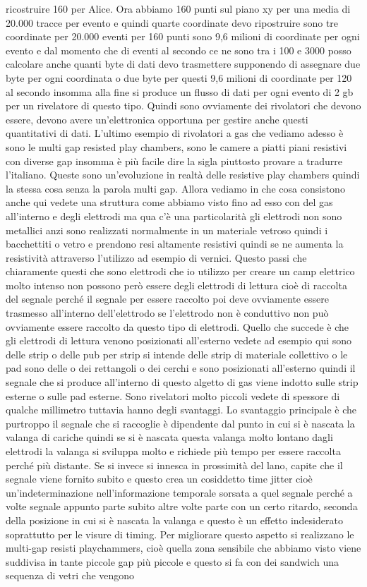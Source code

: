 {ricostruire 160 per Alice. Ora abbiamo 160 punti sul piano xy per una media di 20.000 tracce per evento e quindi quarte coordinate devo ripostruire sono tre coordinate per 20.000 eventi per 160 punti sono 9,6 milioni di coordinate per ogni evento e dal momento che di eventi al secondo ce ne sono tra i 100 e 3000 posso calcolare anche quanti byte di dati devo trasmettere supponendo di assegnare due byte per ogni coordinata o due byte per questi 9,6 milioni di coordinate per 120 al secondo insomma alla fine si produce un flusso di dati per ogni evento di 2 gb per un rivelatore di questo tipo. Quindi sono ovviamente dei rivolatori che devono essere, devono avere un'elettronica opportuna per gestire anche questi quantitativi di dati. L'ultimo esempio di rivolatori a gas che vediamo adesso è sono le multi gap resisted play chambers, sono le camere a piatti piani resistivi con diverse gap insomma è più facile dire la sigla piuttosto provare a tradurre l'italiano. Queste sono un'evoluzione in realtà delle resistive play chambers quindi la stessa cosa senza la parola multi gap. Allora vediamo in che cosa consistono anche qui vedete una struttura come abbiamo visto fino ad esso con del gas all'interno e degli elettrodi ma qua c'è una particolarità gli elettrodi non sono metallici anzi sono realizzati normalmente in un materiale vetroso quindi i bacchettiti o vetro e prendono resi altamente resistivi quindi se ne aumenta la resistività attraverso l'utilizzo ad esempio di vernici. Questo passi che chiaramente questi che sono elettrodi che io utilizzo per creare un camp elettrico molto intenso non possono però essere degli elettrodi di lettura cioè di raccolta del segnale perché il segnale per essere raccolto poi deve ovviamente essere trasmesso all'interno dell'elettrodo se l'elettrodo non è conduttivo non può ovviamente essere raccolto da questo tipo di elettrodi. Quello che succede è che gli elettrodi di lettura venono posizionati all'esterno vedete ad esempio qui sono delle strip o delle pub per strip si intende delle strip di materiale collettivo o le pad sono delle o dei rettangoli o dei cerchi e sono posizionati all'esterno quindi il segnale che si produce all'interno di questo algetto di gas viene indotto sulle strip esterne o sulle pad esterne. Sono rivelatori molto piccoli vedete di spessore di qualche millimetro tuttavia hanno degli svantaggi. Lo svantaggio principale è che purtroppo il segnale che si raccoglie è dipendente dal punto in cui si è nascata la valanga di cariche quindi se si è nascata questa valanga molto lontano dagli elettrodi la valanga si sviluppa molto e richiede più tempo per essere raccolta perché più distante. Se si invece si innesca in prossimità del lano, capite che il segnale viene fornito subito e questo crea un cosiddetto time jitter cioè un'indeterminazione nell'informazione temporale sorsata a quel segnale perché a volte segnale appunto parte subito altre volte parte con un certo ritardo, seconda della posizione in cui si è nascata la valanga e questo è un effetto indesiderato soprattutto per le visure di timing. Per migliorare questo aspetto si realizzano le multi-gap resisti playchammers, cioè quella zona sensibile che abbiamo visto viene suddivisa in tante piccole gap più piccole e questo si fa con dei sandwich una sequenza di vetri che vengono }
